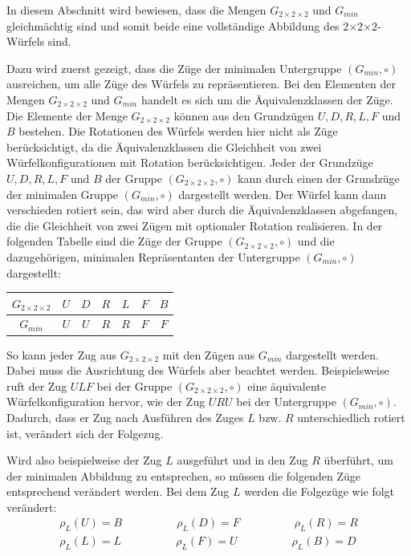 \documentclass[12pt,a4paper, usenames, dvipsnames]{article}
\theoremstyle{mystyle}
\theoremstyle{definition}
\newcommand{\Gtwo}{\ensuremath{G_{2\times 2\times 2}}}
\newcommand{\Ttwo}{2$\times$2$\times$2-}
\begin{document}

In diesem Abschnitt wird bewiesen, dass die Mengen $\Gtwo$ und $G_{min}$ gleichmächtig sind und somit beide eine vollständige Abbildung des \Ttwo Würfels sind. 

Dazu wird zuerst gezeigt, dass die Züge der minimalen Untergruppe $(G_{min}, \circ)$ ausreichen, um alle Züge des Würfels zu repräsentieren. Bei den Elementen der Mengen $\Gtwo$ und $G_{min}$ handelt es sich um die Äquivalenzklassen der Züge. Die Elemente der Menge $\Gtwo$ können aus den Grundzügen $U, D, R, L, F$ und $B$ bestehen. Die Rotationen des Würfels werden hier nicht als Züge berücksichtigt, da die Äquivalenzklassen die Gleichheit von zwei Würfelkonfigurationen mit Rotation berücksichtigen.
Jeder der Grundzüge $U, D, R, L, F$ und $B$ der Gruppe $(\Gtwo, \circ)$ kann durch einen der Grundzüge der minimalen Gruppe $(G_{min}, \circ)$ dargestellt werden. Der Würfel kann dann verschieden rotiert sein, das wird aber durch die Äquivalenzklassen abgefangen, die die Gleichheit von zwei Zügen mit optionaler Rotation realisieren. In der folgenden Tabelle sind die Züge der Gruppe $(\Gtwo, \circ)$ und die dazugehörigen, minimalen Repräsentanten der Untergruppe $(G_{min}, \circ)$ dargestellt:

\begin{center}
\begin{tabular}{c c c c c c c }
$\Gtwo$ & $U$ & $D$ & $R$  & $L$  & $F$  & $B$  \\
\midrule
$G_{min}$ & $U$ & $U$ & $R$  & $R$  & $F$  & $F$  \\
\end{tabular}
\end{center}

So kann jeder Zug aus $\Gtwo$ mit den Zügen aus $G_{min}$ dargestellt werden. Dabei muss die Ausrichtung des Würfels aber beachtet werden. Beispielsweise ruft der Zug $ULF$ bei der Gruppe $(\Gtwo, \circ)$ eine äquivalente Würfelkonfiguration hervor, wie der Zug $URU$ bei der Untergruppe $(G_{min}, \circ)$. Dadurch, dass er Zug nach Ausführen des Zuges $L$ bzw. $R$ unterschiedlich rotiert ist, verändert sich der Folgezug.

Wird also beispielweise der Zug $L$ ausgeführt und in den Zug $R$ überführt, um der minimalen Abbildung zu entsprechen, so müssen die folgenden Züge entsprechend verändert werden. Bei dem Zug $L$ werden die Folgezüge wie folgt verändert:
\begin{align*}
\rho_L(U) = B \ \ \ \ \ \ \ \ \ \ \ \ \ \ \ \ \ \ \ \ \ \  \rho_L(D) = F \ \ \ \ \ \ \ \ \ \ \ \ \ \ \ \ \ \ \ \ \ \   \rho_L(R) = R \\
\rho_L(L) = L \ \ \ \ \ \ \ \ \ \ \ \ \ \ \ \ \ \ \ \ \ \  \rho_L(F) = U \ \ \ \ \ \ \ \ \ \ \ \ \ \ \ \ \ \ \ \ \ \  \rho_L(B) = D 
\end{align*}
\end{document}
